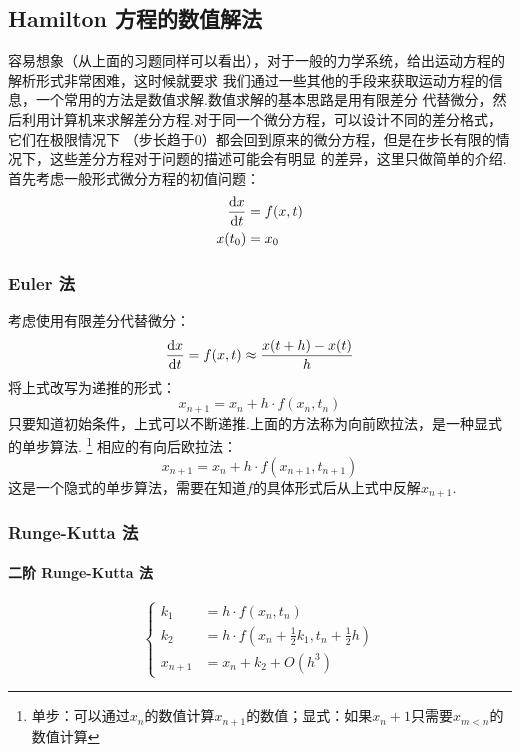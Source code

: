     \subsection{Hamilton 方程的数值解法}
    容易想象（从上面的习题同样可以看出），对于一般的力学系统，给出运动方程的解析形式非常困难，这时候就要求
    我们通过一些其他的手段来获取运动方程的信息，一个常用的方法是数值求解.数值求解的基本思路是用有限差分
    代替微分，然后利用计算机来求解差分方程.对于同一个微分方程，可以设计不同的差分格式，它们在极限情况下
    （步长趋于0）都会回到原来的微分方程，但是在步长有限的情况下，这些差分方程对于问题的描述可能会有明显
    的差异，这里只做简单的介绍.首先考虑一般形式微分方程的初值问题：
    \begin{equation}
        \begin{split}
            \frac{\mathrm{d}{x}}{\mathrm{d}{t}} &= f(x, t) \\
            x(t_0) &= x_0
        \end{split}
    \end{equation}
    \subsubsection{Euler 法}
    考虑使用有限差分代替微分：
    \begin{equation}
        \frac{\mathrm{d}{x}}{\mathrm{d}{t}} = f(x, t) \approx \frac{x(t + h) - x(t)}{h}
    \end{equation}
    将上式改写为递推的形式：
    \begin{equation}
        x_{n+1} = x_n + h\cdot f(x_n, t_n)
    \end{equation}
    只要知道初始条件，上式可以不断递推.上面的方法称为向前欧拉法，是一种显式的单步算法.
    \footnote{
        单步：可以通过$x_n$的数值计算$x_{n+1}$的数值；显式：如果$x_n+1$只需要$x_{m<n}$的数值计算
    }
    相应的有向后欧拉法：
    \begin{equation}
        x_{n+1} = x_n + h\cdot f(x_{n+1}, t_{n+1})
    \end{equation}
    这是一个隐式的单步算法，需要在知道$f$的具体形式后从上式中反解$x_{n+1}$.
    \subsubsection{Runge-Kutta 法}
    \paragraph{二阶 Runge-Kutta 法}
    \begin{equation}
        \left\{
            \begin{split}
                k_1 &= h\cdot f(x_n, t_n)\\
                k_2 &= h\cdot f(x_n + \frac{1}{2}k_1, t_n + \frac{1}{2}h)\\
                x_{n+1} &= x_n + k_2 + O(h^3)
            \end{split}
        \right.
    \end{equation}
